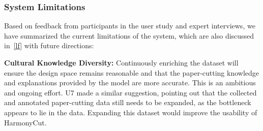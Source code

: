 \subsubsection{System Limitations}\label{limitations}
Based on feedback from participants in the user study and expert interviews, we have summarized the current limitations of the system, which are also discussed in~\autoref{lf} with future directions:

\noindent\textbf{Cultural Knowledge Diversity:}  Continuously enriching the dataset will ensure the design space remains reasonable and that the paper-cutting knowledge and explanations provided by the model are more accurate. This is an ambitious and ongoing effort. U7 made a similar suggestion, pointing out that the collected and annotated paper-cutting data still needs to be expanded, as the bottleneck appears to lie in the data. Expanding this dataset would improve the usability of HarmonyCut.

